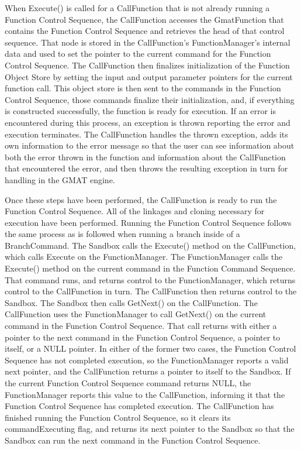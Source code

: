 When Execute() is called for a CallFunction that is not already running a Function Control Sequence,
the CallFunction accesses the GmatFunction that contains the Function Control Sequence and
retrieves the head of that control sequence.  That node is stored in the CallFunction's
FunctionManager's internal data and used to set the pointer to the current command for the Function
Control Sequence.  The CallFunction then finalizes initialization of the Function Object Store by
setting the input and output parameter pointers for the current function call.  This object store is
then sent to the commands in the Function Control Sequence, those commands finalize their
initialization, and, if everything is constructed successfully, the function is ready for execution.
 If an error is encountered during this process, an exception is thrown reporting the error and
execution terminates.  The CallFunction handles the thrown exception, adds its own information to
the error message so that the user can see information about both the error thrown in the function
and information about the CallFunction that encountered the error, and then throws the resulting
exception in turn for handling in the GMAT engine.

Once these steps have been performed, the CallFunction is ready to run the Function Control
Sequence.  All of the linkages and cloning necessary for execution have been performed.  Running
the Function Control Sequence follows the same process as is followed when running a branch inside
of a BranchCommand.  The Sandbox calls the Execute() method on the CallFunction, which calls
Execute on the FunctionManager.  The FunctionManager calls the Execute() method on the current
command in the Function Command Sequence.  That command runs, and returns control to the
FunctionManager, which returns control to the CallFunction in turn.  The CallFunction then returns
control to the Sandbox. The Sandbox then calls GetNext() on the CallFunction.  The CallFunction
uses the FunctionManager to call GetNext() on the current command in the Function Control
Sequence. That call returns with either a pointer to the next command in the Function Control
Sequence, a pointer to itself, or a NULL pointer.  In either of the former two cases, the Function
Control Sequence has not completed execution, so the FunctionManager reports a valid next pointer,
and the CallFunction returns a pointer to itself to the Sandbox.  If the current Function Control
Sequence command returns NULL, the FunctionManager reports this value to the CallFunction,
informing it that the Function Control Sequence has completed execution.  The CallFunction has
finished running the Function Control Sequence, so it clears its commandExecuting flag, and returns
its next pointer to the Sandbox so that the Sandbox can run the next command in the Function Control
Sequence.

